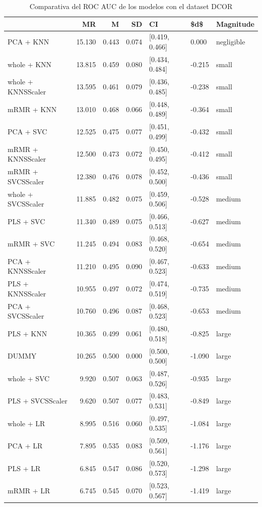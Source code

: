 \documentclass[a4paper,oneside,11pt,leqno]{article}
\begin{document}
	\begin{table}[h]
		\centering
		\begin{tabular}{lrrrlll}
			\toprule
			{} &     MR &     M &    SD &              CI &    \$d\$ &   Magnitude \\
			\midrule
			PCA + KNN          & 15.130 & 0.443 & 0.074 &  [0.419, 0.466] &  0.000 &  negligible \\
			whole + KNN        & 13.815 & 0.459 & 0.080 &  [0.434, 0.484] & -0.215 &       small \\
			whole + KNNSScaler & 13.595 & 0.461 & 0.079 &  [0.436, 0.485] & -0.238 &       small \\
			mRMR + KNN         & 13.010 & 0.468 & 0.066 &  [0.448, 0.489] & -0.364 &       small \\
			PCA + SVC          & 12.525 & 0.475 & 0.077 &  [0.451, 0.499] & -0.432 &       small \\
			mRMR + KNNSScaler  & 12.500 & 0.473 & 0.072 &  [0.450, 0.495] & -0.412 &       small \\
			mRMR + SVCSScaler  & 12.380 & 0.476 & 0.078 &  [0.452, 0.500] & -0.436 &       small \\
			whole + SVCSScaler & 11.885 & 0.482 & 0.075 &  [0.459, 0.506] & -0.528 &      medium \\
			PLS + SVC          & 11.340 & 0.489 & 0.075 &  [0.466, 0.513] & -0.627 &      medium \\
			mRMR + SVC         & 11.245 & 0.494 & 0.083 &  [0.468, 0.520] & -0.654 &      medium \\
			PCA + KNNSScaler   & 11.210 & 0.495 & 0.090 &  [0.467, 0.523] & -0.633 &      medium \\
			PLS + KNNSScaler   & 10.955 & 0.497 & 0.072 &  [0.474, 0.519] & -0.735 &      medium \\
			PCA + SVCSScaler   & 10.760 & 0.496 & 0.087 &  [0.468, 0.523] & -0.653 &      medium \\
			PLS + KNN          & 10.365 & 0.499 & 0.061 &  [0.480, 0.518] & -0.825 &       large \\
			DUMMY              & 10.265 & 0.500 & 0.000 &  [0.500, 0.500] & -1.090 &       large \\
			whole + SVC        &  9.920 & 0.507 & 0.063 &  [0.487, 0.526] & -0.935 &       large \\
			PLS + SVCSScaler   &  9.620 & 0.507 & 0.077 &  [0.483, 0.531] & -0.849 &       large \\
			whole + LR         &  8.995 & 0.516 & 0.060 &  [0.497, 0.535] & -1.084 &       large \\
			PCA + LR           &  7.895 & 0.535 & 0.083 &  [0.509, 0.561] & -1.176 &       large \\
			PLS + LR           &  6.845 & 0.547 & 0.086 &  [0.520, 0.573] & -1.298 &       large \\
			mRMR + LR          &  6.745 & 0.545 & 0.070 &  [0.523, 0.567] & -1.419 &       large \\
			\bottomrule
		\end{tabular}
		\caption{Comparativa del ROC AUC de los modelos con el dataset DCOR}
		\label{tab:stat_results_dcor}
	\end{table}
\end{document}
